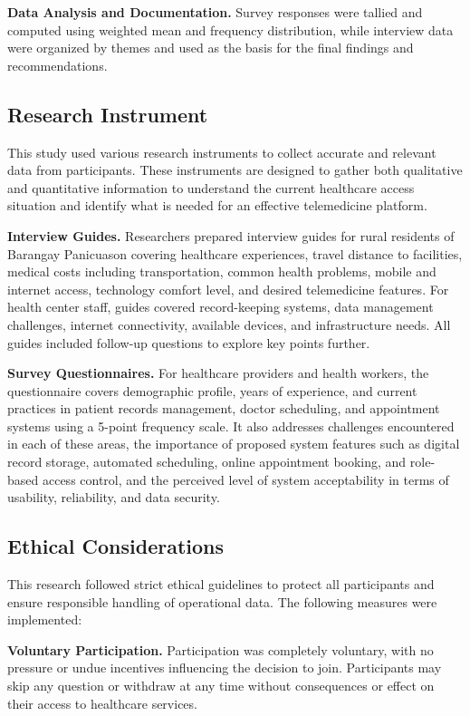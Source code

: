 \documentclass{research}
\begin{document}
\textbf{Data Analysis and Documentation.} Survey responses were tallied and computed using
weighted mean and frequency distribution, while interview data were organized by themes and used
as the basis for the final findings and recommendations.

\subsection*{Research Instrument}

This study used various research instruments to collect accurate and relevant data from
participants. These instruments are designed to gather both qualitative and quantitative
information to understand the current healthcare access situation and identify what is needed for
an effective telemedicine platform.

\textbf{Interview Guides.} Researchers prepared interview guides for rural residents of Barangay
Panicuason covering healthcare experiences, travel distance to facilities, medical costs including
transportation, common health problems, mobile and internet access, technology comfort level, and
desired telemedicine features. For health center staff, guides covered record-keeping systems,
data management challenges, internet connectivity, available devices, and infrastructure needs.
All guides included follow-up questions to explore key points further.

\textbf{Survey Questionnaires.} For healthcare providers and health workers, the questionnaire
covers demographic profile, years of experience, and current practices in patient records
management, doctor scheduling, and appointment systems using a 5-point frequency scale. It also
addresses challenges encountered in each of these areas, the importance of proposed system
features such as digital record storage, automated scheduling, online appointment booking, and
role-based access control, and the perceived level of system acceptability in terms of usability,
reliability, and data security.

\subsection*{Ethical Considerations}

This research followed strict ethical guidelines to protect all participants and ensure
responsible handling of operational data. The following measures were implemented:

\textbf{Voluntary Participation.} Participation was completely voluntary, with no pressure or
undue incentives influencing the decision to join. Participants may skip any question or withdraw
at any time without consequences or effect on their access to healthcare services.
\end{document}
